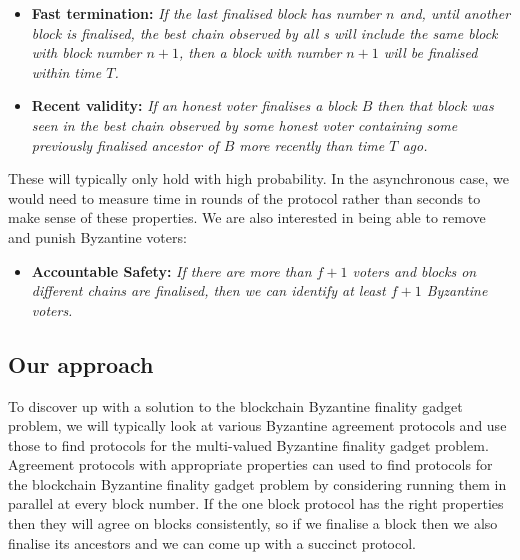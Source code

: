 \documentclass{article}
\begin{document}
\begin{itemize}
\item{\bf Fast termination:} {\em If the last finalised block has number $n$ and, until another block is finalised, the best chain observed by all  s will include the same block with block number $n+1$, then a block with number $n+1$ will be finalised within time $T$.}
\item{\bf Recent validity:} {\em If an honest voter finalises a block $B$ then that block was seen in the best chain observed by some honest voter containing some previously finalised ancestor of $B$ more recently than time $T$ ago.}
\end{itemize}

These will typically only hold with high probability. In the asynchronous case, we would need to measure time in rounds of the protocol rather than seconds to make sense of these properties.  We are also interested in being able to remove and punish Byzantine voters:

\begin{itemize}
	\item{\bf Accountable Safety:} {\em If there are more than $f+1$ voters and blocks on different chains are finalised, then we can identify at least $f+1$ Byzantine voters.}
\end{itemize}

\subsection{Our approach}

To discover up with a solution to the blockchain Byzantine finality gadget problem, we will typically look at various Byzantine agreement protocols and use those to find protocols for the multi-valued Byzantine finality gadget problem. 
Agreement protocols with appropriate properties can used to find protocols for the blockchain Byzantine finality gadget problem by considering running them in parallel at every block number.
If the one block protocol has the right properties then they will agree on blocks consistently, so if we finalise a block then we also finalise its ancestors and we can come up with a succinct protocol.
\end{document}
